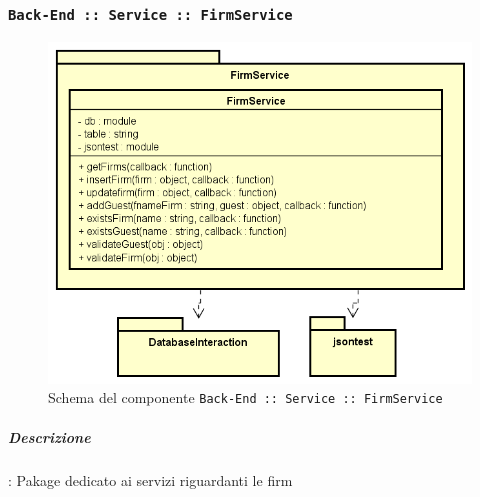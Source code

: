 \documentclass[../DefinizioneDiProdotto_v2.0.0.tex]{subfiles}
\begin{document}
\subsubsection{\texttt{Back-End :: Service :: FirmService}}
\begin{figure}[!h]
	\centering
	\includegraphics[scale=0.6]{Architettura/Back-End/Service/FirmService.png}
	\caption{Schema del componente \texttt{Back-End :: Service :: FirmService}}
\end{figure}

\subparagraph{Descrizione}: Pakage dedicato ai servizi riguardanti le firm
\end{document}
